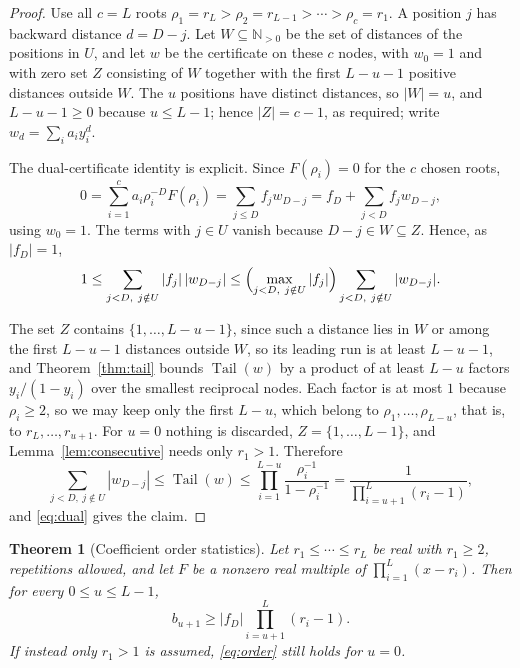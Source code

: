 \documentclass[11pt]{article}
\newtheorem{theorem}{Theorem}[section]
\newcommand{\N}{\mathbb N}
\DeclareMathOperator{\Tail}{Tail}
\begin{document}
\begin{proof}
Use all $c=L$ roots $\rho_1=r_L>\rho_2=r_{L-1}>\cdots>\rho_c=r_1$.  A
position $j$ has backward distance $d=D-j$.  Let $W\subseteq\N_{>0}$ be the
set of distances of the positions in $U$, and let $w$ be the certificate on
these $c$ nodes, with $w_0=1$ and with zero set $Z$ consisting of $W$
together with the first $L-u-1$ positive distances outside $W$.  The $u$
positions have distinct distances, so $|W|=u$, and $L-u-1\ge0$ because
$u\le L-1$; hence $|Z|=c-1$, as required; write $w_d=\sum_i a_iy_i^d$.

The dual-certificate identity is explicit.  Since $F(\rho_i)=0$ for the $c$
chosen roots,
\[
  0=\sum_{i=1}^c a_i\rho_i^{-D}F(\rho_i)
   =\sum_{j\le D}f_jw_{D-j}
   =f_D+\sum_{j<D}f_jw_{D-j},
\]
using $w_0=1$.  The terms with $j\in U$ vanish because $D-j\in W\subseteq Z$.
Hence, as $|f_D|=1$,
\begin{equation}\label{eq:dual}
  1\le\sum_{j<D,\ j\notin U}|f_j|\,|w_{D-j}|
  \le\Bigl(\max_{j<D,\ j\notin U}|f_j|\Bigr)
        \sum_{j<D,\ j\notin U}|w_{D-j}|.
\end{equation}

The set $Z$ contains $\{1,\ldots,L-u-1\}$, since such a distance lies in $W$
or among the first $L-u-1$ distances outside $W$, so its leading run is at least
$L-u-1$, and Theorem~\ref{thm:tail} bounds $\Tail(w)$ by a product of at
least $L-u$ factors $y_i/(1-y_i)$ over the smallest reciprocal nodes.  Each
factor is at most $1$ because $\rho_i\ge2$, so we may keep only the first
$L-u$, which belong to $\rho_1,\ldots,\rho_{L-u}$, that is, to
$r_L,\ldots,r_{u+1}$.  For $u=0$ nothing is discarded, $Z=\{1,\ldots,L-1\}$,
and Lemma~\ref{lem:consecutive} needs only $r_1>1$.  Therefore
\[
  \sum_{j<D,\ j\notin U}|w_{D-j}|
  \le\Tail(w)
  \le\prod_{i=1}^{L-u}\frac{\rho_i^{-1}}{1-\rho_i^{-1}}
  =\frac{1}{\prod_{i=u+1}^L(r_i-1)},
\]
and \eqref{eq:dual} gives the claim.
\end{proof}

\begin{theorem}[Coefficient order statistics]\label{thm:order}
Let $r_1\le\cdots\le r_L$ be real with $r_1\ge2$, repetitions allowed, and
let $F$ be a nonzero real multiple of $\prod_{i=1}^L(x-r_i)$.  Then for every
$0\le u\le L-1$,
\begin{equation}\label{eq:order}
  b_{u+1}\ge|f_D|\prod_{i=u+1}^L(r_i-1).
\end{equation}
If instead only $r_1>1$ is assumed, \eqref{eq:order} still holds for $u=0$.
\end{theorem}
\end{document}
